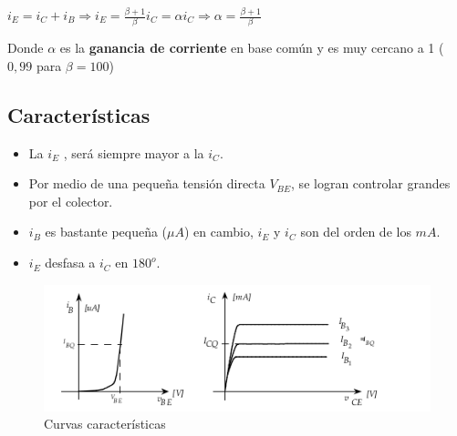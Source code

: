 \documentclass[oneside]{book}
\numberwithin{equation}{section}
\numberwithin{figure}{section}
\numberwithin{table}{section}
\begin{document}
				\begin{center}
					$\displaystyle i_E=i_C+i_B \Rightarrow i_E=\frac{\beta+1}{\beta} i_C=\alpha i_C \Rightarrow \alpha=\frac{\beta+1}{\beta}$
				\end{center}
			
			 Donde $\alpha$ es la \textbf{ganancia de corriente} en base común y es muy cercano a 1 ($0,99$ para $\beta=100$)
			
			\subsection{Características}
			
			\begin{itemize}
				\item La $i_E$ , será siempre mayor a la $i_C$.
				\item Por medio de una pequeña tensión directa $V_{BE}$, se logran controlar grandes por el colector.
				\item $i_B$ es bastante pequeña ($\mu A$) en cambio, $i_E$ y $i_C$ son del orden de los $mA$.
				\item $i_E$ desfasa a $i_C$ en $180^o$.
			\end{itemize}
			
				\begin{figure}[H]
					\begin{center}
						\includegraphics[scale=0.75]{TBJ.png}
						\caption{Curvas características}
					\end{center}
				\end{figure}				
			
			
			
\pagebreak
\end{document}
